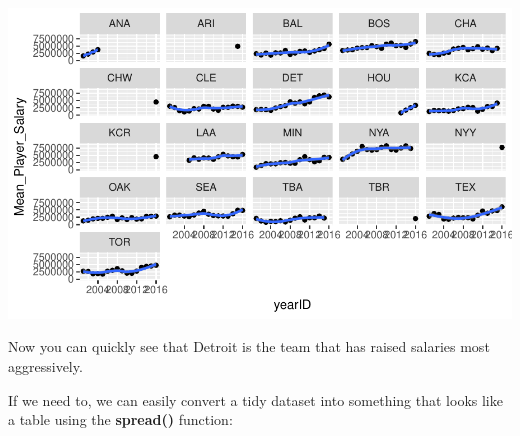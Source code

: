 \documentclass[]{book}
\newenvironment{Shaded}{\begin{snugshade}}{\end{snugshade}}
\newcommand{\DataTypeTok}[1]{\textcolor[rgb]{0.13,0.29,0.53}{#1}}
\newcommand{\DecValTok}[1]{\textcolor[rgb]{0.00,0.00,0.81}{#1}}
\newcommand{\KeywordTok}[1]{\textcolor[rgb]{0.13,0.29,0.53}{\textbf{#1}}}
\newcommand{\NormalTok}[1]{#1}
\newcommand{\OperatorTok}[1]{\textcolor[rgb]{0.81,0.36,0.00}{\textbf{#1}}}
\newcommand{\StringTok}[1]{\textcolor[rgb]{0.31,0.60,0.02}{#1}}
\theoremstyle{definition}
\theoremstyle{definition}
\theoremstyle{definition}
\theoremstyle{remark}
\begin{document}
\begin{Shaded}
\end{Shaded}

\begin{center}\includegraphics[width=0.7\linewidth]{DS4PS-I_files/figure-latex/unnamed-chunk-178-1} \end{center}

Now you can quickly see that Detroit is the team that has raised
salaries most aggressively.

If we need to, we can easily convert a tidy dataset into something that
looks like a table using the \textbf{spread()} function:
\end{document}
